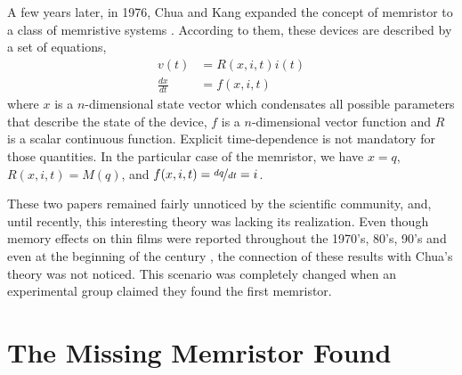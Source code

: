 A few years later, in 1976, Chua and Kang expanded the concept of memristor to a class of memristive systems \cite{Chua1976}. According to them, these devices are described by a set of equations,
\begin{align}
 v(t)&=R(x,i,t)i(t)\label{eq:memristive_devices_res} \\
 \frac{dx}{dt}&=f(x,i,t) \label{eq:memristive_devices_var}
\end{align}
where $x$ is a $n$-dimensional state vector which condensates all possible parameters that describe the state of the device, $f$ is a $n$-dimensional vector function and $R$ is a scalar continuous function. Explicit time-dependence is not mandatory for those quantities. In the particular case of the memristor, we have $x = q$, \(R(x,i,t) = M(q)\), and \(f(x,i,t) = \nicefrac{dq}{dt} = i\).

These two papers remained fairly unnoticed by the scientific community, and, until recently, this interesting theory was lacking its realization. Even though memory effects on thin films were reported throughout the 1970's, 80's, 90's and even at the beginning of the century \cite{Dearnaley1970,Pinto1971,Oxley1977,Hirose1976,Beck2000,Upadhyaya1995,Kim2006}, the connection of these results with Chua's theory was not noticed. This scenario was completely changed when an experimental group claimed they found the first memristor.

\section{The Missing Memristor Found}

